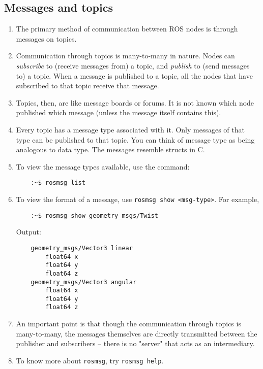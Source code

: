 \documentclass{article}
\begin{document}
        \subsection{Messages and topics}
            \begin{enumerate}
                \item The primary method of communication between ROS nodes is through messages on topics.
                \item Communication through topics is many-to-many in nature. Nodes can \emph{subscribe} to (receive messages from) a topic,
                and \emph{publish} to (send messages to) a topic. When a message is published to a topic, all the nodes that have subscribed to that 
                topic receive that message.
                \item Topics, then, are like message boards or forums. It is not known which node published which message (unless the message itself contains this).
                \item Every topic has a message type associated with it. Only messages of that type can be published to that topic. You can think of message type as being analogous to data type.
                The messages resemble structs in C.
                \item To view the message types available, use the command:
                \begin{verbatim}
    :~$ rosmsg list
                \end{verbatim}
                \item To view the format of a message, use \texttt{rosmsg show <msg-type>}. For example,
                \begin{verbatim}
    :~$ rosmsg show geometry_msgs/Twist
                \end{verbatim}
                Output:
                \begin{verbatim}
    geometry_msgs/Vector3 linear
        float64 x
        float64 y
        float64 z
    geometry_msgs/Vector3 angular
        float64 x
        float64 y
        float64 z
                \end{verbatim}
                \item An important point is that though the communication through topics is many-to-many,
                the messages themselves are directly transmitted between the publisher and subscribers
                 -- there is no "server" that acts as an intermediary.
                
                \item To know more about \texttt{rosmsg}, try \texttt{rosmsg help}.
            \end{enumerate}
\end{document}
